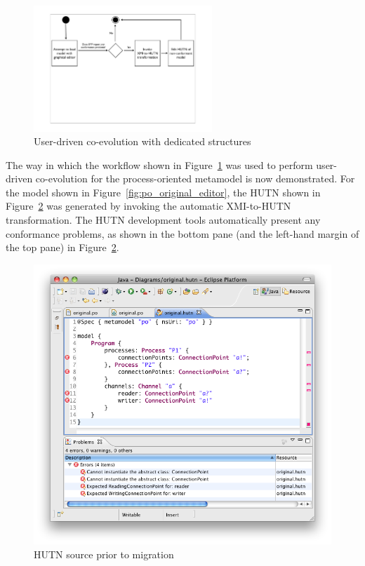 \begin{figure}[htbp]
	\centering
	\includegraphics*[viewport=80 290 760 550,height=4.75cm]{6.Evaluation/images/user_driven/hutn_process.pdf}
	\caption{User-driven co-evolution with dedicated structures}
	\label{fig:hutn_process}
\end{figure}

The way in which the workflow shown in Figure~\ref{fig:hutn_process} was used to perform user-driven co-evolution for the process-oriented metamodel is now demonstrated. For the model shown in Figure~\ref{fig:po_original_editor}, the HUTN shown in Figure~\ref{fig:po_hutn} was generated by invoking the automatic XMI-to-HUTN transformation. The HUTN development tools automatically present any conformance problems, as shown in the bottom pane (and the left-hand margin of the top pane) in Figure~\ref{fig:po_hutn}.

\begin{figure}[htbp]
  \centering
  \includegraphics[width=13.5cm]{6.Evaluation/images/user_driven/po_hutn.png}
  \caption{HUTN source prior to migration}
  \label{fig:po_hutn}
\end{figure}

